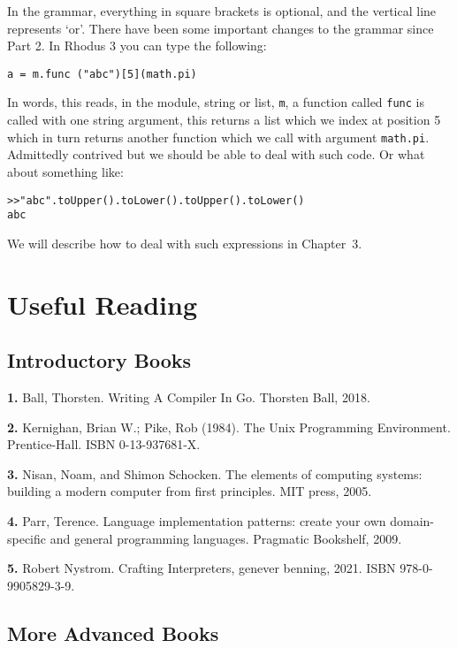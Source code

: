 In the grammar, everything in square brackets is optional, and the vertical line represents `or'. There have been some important changes to the grammar since Part 2. In Rhodus 3 you can type the following:

\begin{lstlisting}
a = m.func ("abc")[5](math.pi)
\end{lstlisting}

In words, this reads, in the module, string or list, {\tt m}, a function called {\tt func} is called with one string argument, this returns a list which we index at position 5 which in turn returns another function which we call with argument {\tt math.pi}. Admittedly contrived but we should be able to deal with such code. Or what about something like:

\begin{lstlisting}
>>"abc".toUpper().toLower().toUpper().toLower()
abc
\end{lstlisting}

We will describe how to deal with such expressions in Chapter~3.%

\section{Useful Reading}

\subsection*{Introductory Books}

{\bf 1.} Ball, Thorsten. Writing A Compiler In Go. Thorsten Ball, 2018.

{\bf 2.} Kernighan, Brian W.; Pike, Rob (1984). The Unix Programming Environment. Prentice-Hall. ISBN 0-13-937681-X.

{\bf 3.} Nisan, Noam, and Shimon Schocken. The elements of computing systems: building a modern computer from first principles. MIT press, 2005.

{\bf 4.} Parr, Terence. Language implementation patterns: create your own domain-specific and general programming languages. Pragmatic Bookshelf, 2009.

{\bf 5.} Robert Nystrom. Crafting Interpreters, genever benning, 2021. ISBN 978-0-9905829-3-9.

\subsection*{More Advanced Books}


